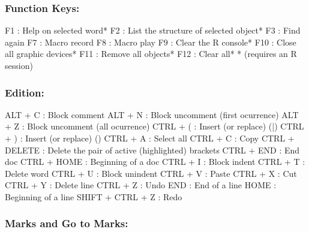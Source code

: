 \subsubsection{Function Keys:}

\vspace{-0.5cm}
\begin{Rtables}[caption={[Function keys]
    Function keys},
  label=hotkey:function]
  F1  : Help on selected word*
  F2  : List the structure of selected object*
  F3  : Find again
  F7  : Macro record
  F8  : Macro play
  F9  : Clear the R console*
  F10 : Close all graphic devices*
  F11 : Remove all objects*
  F12 : Clear all*
  * (requires an R session)
\end{Rtables}


\newpage
\subsubsection{Edition:}

\vspace{-0.5cm}
\begin{Rtables}[caption={[Edition keyboard shortcuts]
    Edition keyboard shortcuts},
  label=hotkey:editions]
  ALT   + C        : Block comment
  ALT   + N        : Block uncomment (first ocurrence)
  ALT   + Z        : Block uncomment (all ocurrence)
  CTRL  + (        : Insert (or replace) (|)
  CTRL  + )        : Insert (or replace) ()
  CTRL  + A        : Select all
  CTRL  + C        : Copy
  CTRL  + DELETE   : Delete the pair of active (highlighted) brackets
  CTRL  + END      : End doc
  CTRL  + HOME     : Beginning of a doc
  CTRL  + I        : Block indent
  CTRL  + T        : Delete word
  CTRL  + U        : Block unindent
  CTRL  + V        : Paste
  CTRL  + X        : Cut
  CTRL  + Y        : Delete line
  CTRL  + Z        : Undo
  END              : End of a line
  HOME             : Beginning of a line
  SHIFT + CTRL + Z : Redo
\end{Rtables}


\subsubsection{Marks and Go to Marks:}

